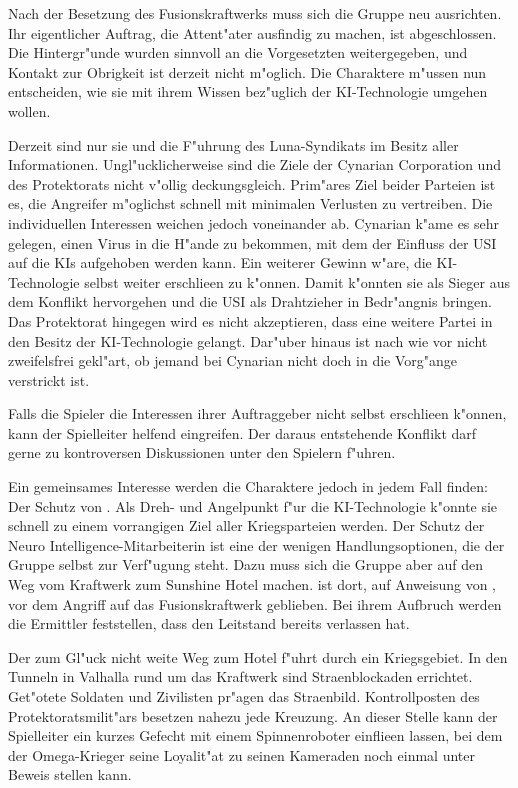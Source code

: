 
Nach der Besetzung des Fusionskraftwerks muss sich die Gruppe neu ausrichten. Ihr eigentlicher Auftrag, die Attent"ater ausfindig zu machen, ist abgeschlossen. Die Hintergr"unde wurden sinnvoll an die Vorgesetzten weitergegeben, und Kontakt zur Obrigkeit ist derzeit nicht m"oglich. Die Charaktere m"ussen nun entscheiden, wie sie mit ihrem Wissen bez"uglich der KI-Technologie umgehen wollen. 

Derzeit sind nur sie und die F"uhrung des Luna-Syndikats im Besitz aller Informationen. Ungl"ucklicherweise sind die Ziele der Cynarian Corporation und des Protektorats nicht v"ollig deckungsgleich. Prim"ares Ziel beider Parteien ist es, die Angreifer m"oglichst schnell mit minimalen Verlusten zu vertreiben. Die individuellen Interessen weichen jedoch voneinander ab. Cynarian k"ame es sehr gelegen, einen Virus in die H"ande zu bekommen, mit dem der Einfluss der USI auf die KIs aufgehoben werden kann. Ein weiterer Gewinn w"are, die KI-Technologie selbst weiter erschlie\3en zu k"onnen. Damit k"onnten sie als Sieger aus dem Konflikt hervorgehen und die USI als Drahtzieher in Bedr"angnis bringen. Das Protektorat hingegen wird es nicht akzeptieren, dass eine weitere Partei in den Besitz der KI-Technologie gelangt. Dar"uber hinaus ist nach wie vor nicht zweifelsfrei gekl"art, ob jemand bei Cynarian nicht doch in die Vorg"ange verstrickt ist.

Falls die Spieler die Interessen ihrer Auftraggeber nicht selbst erschlie\3en k"onnen, kann der Spielleiter helfend eingreifen. Der daraus entstehende Konflikt darf gerne zu kontroversen Diskussionen unter den Spielern f"uhren.

Ein gemeinsames Interesse werden die Charaktere jedoch in jedem Fall finden: Der Schutz von \ml{}. Als Dreh- und Angelpunkt f"ur die KI-Technologie k"onnte sie schnell zu einem vorrangigen Ziel aller Kriegsparteien werden. Der Schutz der Neuro Intelligence-Mitarbeiterin ist eine der wenigen Handlungsoptionen, die der Gruppe selbst zur Verf"ugung steht. Dazu muss sich die Gruppe aber auf den Weg vom Kraftwerk zum Sunshine Hotel machen. \ml{} ist dort, auf Anweisung von \xl{}, vor dem Angriff auf das Fusionskraftwerk geblieben. Bei ihrem Aufbruch werden die Ermittler feststellen, dass \xl{} den Leitstand bereits verlassen hat.

Der zum Gl"uck nicht weite Weg zum Hotel f"uhrt durch ein Kriegsgebiet. In den Tunneln in Valhalla rund um das Kraftwerk sind Stra\3enblockaden errichtet. Get"otete Soldaten und Zivilisten pr"agen das Stra\3enbild. Kontrollposten des Protektoratsmilit"ars besetzen nahezu jede Kreuzung. An dieser Stelle kann der Spielleiter ein kurzes Gefecht mit einem Spinnenroboter einflie\3en lassen, bei dem der Omega-Krieger seine Loyalit"at zu seinen Kameraden noch einmal unter Beweis stellen kann.

